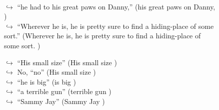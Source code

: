 \documentclass[11pt,a4paper, onecolumn]{article}
\begin{document}
\begin{figure}[t]
\begin{tcolorbox}[boxsep=0pt,left=5pt,right=0pt,top=2pt,colback = yellow!5]
\begin{dialogue}
\\
\colorbox{pink!25}{$\hookrightarrow$}
{ ``he had to his great paws on Danny,'' (his great paws on Danny, ) }
\\
\colorbox{pink!25}{$\hookrightarrow$}
{ ``Wherever he is, he is pretty sure to find a hiding-place of some sort.'' (Wherever he is, he is pretty sure to find a hiding-place of some sort. ) }
\\
 \end{dialogue}\end{tcolorbox}\end{figure}\begin{figure}[t] \small \begin{tcolorbox}[boxsep=0pt,left=5pt,right=0pt,top=2pt,colback = yellow!5] \begin{dialogue}
 \small 
\colorbox{pink!25}{$\hookrightarrow$}
{ ``His small size'' (His small size ) }
\\
\colorbox{pink!25}{$\hookrightarrow$}
\colorbox{red!25}{No,}
{ ``no'' (His small size ) }
\\
\colorbox{pink!25}{$\hookrightarrow$}
{ ``he is big'' (is big ) }
\\
\colorbox{pink!25}{$\hookrightarrow$}
{ ``a terrible gun'' (terrible gun ) }
\\
\colorbox{pink!25}{$\hookrightarrow$}
{ ``Sammy Jay'' (Sammy Jay ) }
\\
 \end{dialogue}\end{tcolorbox}\end{figure}
\end{document}
